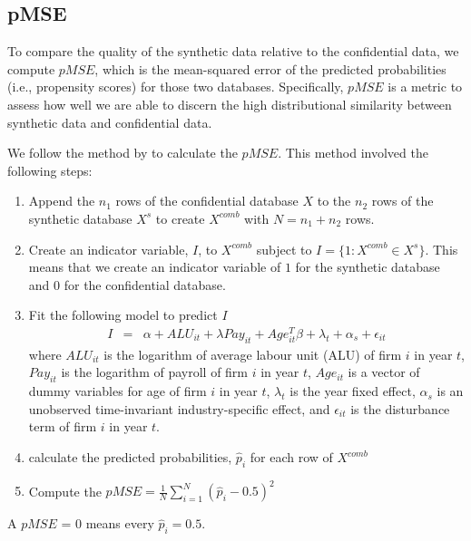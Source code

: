 \subsection{pMSE}

To compare the quality of the synthetic data relative to the confidential data, we compute $pMSE$, which is the mean-squared error of the predicted probabilities (i.e., propensity scores) for those two databases. Specifically, $pMSE$ is a metric to assess how well we are able to discern the high distributional similarity between synthetic data and confidential data. 

We follow the method by \textcite{SnokeSlavkovic2018} to calculate the $pMSE$. This method involved the following steps: 
\begin{enumerate}
    \item Append the $n_1$ rows of the confidential database $X$ to the $n_2$ rows of the synthetic database $X^s$ to create $X^{comb}$ with $N=n_1 + n_2$ rows.
    \item Create an indicator variable, $I$, to $X^{comb}$ subject to $I=\{1: X^{comb} \in X^s\}$. This means that we create an indicator variable of $1$ for the synthetic database and $0$ for the confidential database. 
    \item Fit the following model to predict $I$
    \begin{eqnarray}	
        I & = &\alpha + ALU_{it} + \lambda Pay_{it} + Age_{it}^{T}\beta + \lambda_t + \alpha_s + \epsilon_{it} \label{pMSE}
     \end{eqnarray}
    where $ALU_{it}$ is the logarithm of average labour unit (ALU) of firm $i$ in year $t$, $Pay_{it}$ is the logarithm of payroll of firm $i$ in year $t$, $Age_{it}$ is a vector of dummy variables for age of firm $i$ in year $t$, $\lambda_t$ is the year fixed effect, $\alpha_s$ is an unobserved time-invariant industry-specific effect, and $\epsilon_{it}$ is the disturbance term of firm $i$ in year $t$. 
    \item calculate the predicted probabilities, $\hat{p}_i$ for each row of $X^{comb}$
    \item Compute the $pMSE=\frac{1}{N}\sum_{i=1}^N(\hat{p}_i - 0.5)^2$
\end{enumerate}
A $pMSE$ = 0 means every $\hat{p}_i = 0.5$. 

